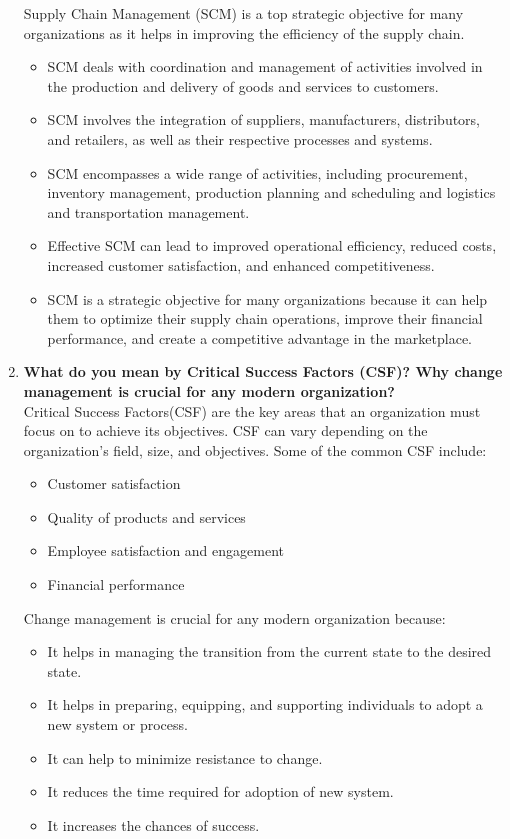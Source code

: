 \documentclass[12pt]{article}
\begin{document}
\begin{enumerate}
    Supply Chain Management (SCM) is a top strategic objective for many organizations as it helps in improving the efficiency of the supply chain. 
    \begin{itemize}
        \item SCM deals with coordination and management of activities involved in the production and delivery of goods and services to customers.
        \item SCM involves the integration of suppliers, manufacturers, distributors, and retailers, as well as their respective processes and systems.
        \item SCM encompasses a wide range of activities, including procurement, inventory management, production planning and scheduling and logistics and transportation management.
        \item Effective SCM can lead to improved operational efficiency, reduced costs, increased customer satisfaction, and enhanced competitiveness.
        \item SCM is a strategic objective for many organizations because it can help them to optimize their supply chain operations, improve their financial performance, and create a competitive advantage in the marketplace.
        \end{itemize}
    \item {\bfseries What do you mean by Critical Success Factors (CSF)? Why change management is crucial for any modern organization?\\}
    Critical Success Factors(CSF) are the key areas that an organization must focus on to achieve its objectives. CSF can vary depending on the organization's field, size, and objectives. Some of the common CSF include:
        \begin{itemize}
            \item Customer satisfaction
            \item Quality of products and services
            \item Employee satisfaction and engagement
            \item Financial performance
        \end{itemize}

Change management is crucial for any modern organization because:
\begin{itemize}
    \item It helps in managing the transition from the current state to the desired state.
    \item It helps in preparing, equipping, and supporting individuals to adopt a new system or process. 
    \item It can help to minimize resistance to change.
    \item It reduces the time required for adoption of new system.
    \item It increases the chances of success.
\end{itemize}
    

\end{enumerate}
\end{document}
